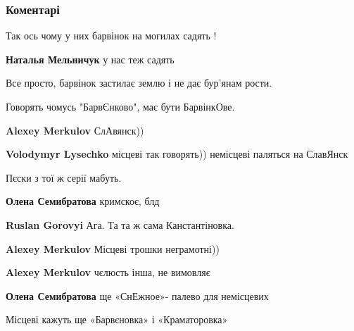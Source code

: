  
 
 
 
 
\subsubsection{Коментарі}
\label{sec:02_10_2021.fb.gorovyj_ruslan.1.poezd_kiev_konstantinovka_barvinok.cmt}

\begin{itemize} %
Так ось чому у них барвінок на могилах садять !

\begin{itemize} %
\textbf{Наталья Мельничук} у нас теж садять

Все просто, барвінок застилає землю і не дає бур'янам рости.
\end{itemize} %

Говорять чомусь "БарвЄнково", має бути БарвінкОве.

\begin{itemize} %
\textbf{Alexey Merkulov} СлАвянск))

\textbf{Volodymyr Lysechko} місцеві так говорять)) немісцеві паляться на СлавЯнск

Пєски з тої ж серії мабуть.

\textbf{Олена Семибратова} кримскоє, блд

\textbf{Ruslan Gorovyi} Ага. Та та ж сама Канстантіновка.

\textbf{Alexey Merkulov} Місцеві трошки неграмотні))

\textbf{Alexey Merkulov} чєлюсть інша, не вимовляє

\textbf{Олена Семибратова} ще «СнЕжное»- палево для немісцевих

Місцеві кажуть ще «Барвєновка» і «Краматоровка»

\end{itemize} %


\end{itemize}
